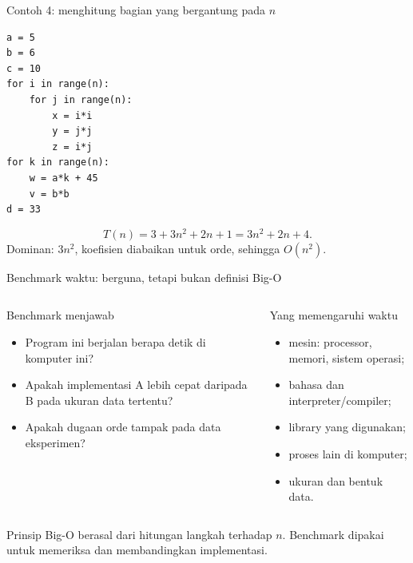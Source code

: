 \documentclass[aspectratio=169,11pt]{beamer}
\begin{document}
\begin{frame}[fragile]{Contoh 4: menghitung bagian yang bergantung pada $n$}
\begin{lstlisting}
a = 5
b = 6
c = 10
for i in range(n):
    for j in range(n):
        x = i*i
        y = j*j
        z = i*j
for k in range(n):
    w = a*k + 45
    v = b*b
d = 33
\end{lstlisting}
\pause
\[
T(n) = 3 + 3n^2 + 2n + 1 = 3n^2+2n+4.
\]
\pause
Dominan: $3n^2$, koefisien diabaikan untuk orde, sehingga $O(n^2)$.
\end{frame}

\begin{frame}{Benchmark waktu: berguna, tetapi bukan definisi Big-O}
\begin{columns}[T]
\begin{block}{Benchmark menjawab}
\begin{itemize}
\item Program ini berjalan berapa detik di komputer ini?
\item Apakah implementasi A lebih cepat daripada B pada ukuran data tertentu?
\item Apakah dugaan orde tampak pada data eksperimen?
\end{itemize}
\end{block}
\begin{block}{Yang memengaruhi waktu}
\begin{itemize}
\item mesin: processor, memori, sistem operasi;
\item bahasa dan interpreter/compiler;
\item library yang digunakan;
\item proses lain di komputer;
\item ukuran dan bentuk data.
\end{itemize}
\end{block}
\end{columns}
\begin{alertblock}{Prinsip}
Big-O berasal dari hitungan langkah terhadap $n$. Benchmark dipakai untuk memeriksa dan membandingkan implementasi.
\end{alertblock}
\end{frame}
\end{document}
